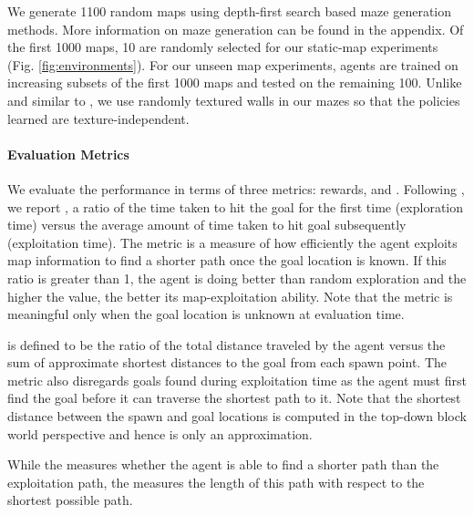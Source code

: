 We generate 1100 random maps using depth-first search based maze generation methods.
More information on maze generation can be found in the appendix. 
Of the first 1000 maps, 10 are randomly selected for our static-map experiments (Fig. \ref{fig:environments}). For our unseen map experiments, agents are trained on increasing subsets of the first 1000 maps and tested on the remaining 100.
Unlike \cite{MiPaViICLR2017} and similar to \cite{ChLaSaNIPS2016}, we use randomly textured walls in our mazes so that the policies learned are texture-independent.

\paragraph{Evaluation Metrics}

We evaluate the performance in terms of three metrics: rewards, \emph{\LatencyOneGtOne{}} and \emph{\DistanceInefficiency}.
Following \cite{MiPaViICLR2017}, we report \emph{\LatencyOneGtOne{}}, a ratio of the time taken to hit the goal for the first time (exploration time) versus the average amount of time taken to hit goal subsequently (exploitation time).
The metric is a measure of how efficiently the agent exploits map information to find a shorter path once the goal location is known. 
If this ratio is greater than 1, the agent is doing better than random exploration and the higher the value, the better its map-exploitation ability.
Note that the metric is meaningful only when the goal location is unknown at evaluation time.


\emph{\DistanceInefficiency{}} is defined to be the ratio of the total distance traveled by the agent versus the sum of approximate shortest distances to the goal from each spawn point. The metric also disregards goals found during exploitation time as the agent must first find the goal before it can traverse the shortest path to it.
Note that the shortest distance between the spawn and goal locations is computed in the top-down block world perspective and hence is only an approximation.

While the \LatencyOneGtOne{} measures whether the agent is able to find a shorter path than the exploitation path, the \DistanceInefficiency{} measures the length of this path with respect to the shortest possible path. 


